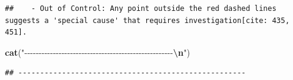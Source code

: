 \documentclass[
]{article}
\newenvironment{Shaded}{\begin{snugshade}}{\end{snugshade}}
\newcommand{\FunctionTok}[1]{\textcolor[rgb]{0.13,0.29,0.53}{\textbf{#1}}}
\newcommand{\NormalTok}[1]{#1}
\newcommand{\SpecialCharTok}[1]{\textcolor[rgb]{0.81,0.36,0.00}{\textbf{#1}}}
\newcommand{\StringTok}[1]{\textcolor[rgb]{0.31,0.60,0.02}{#1}}
\begin{document}
\begin{verbatim}
##    - Out of Control: Any point outside the red dashed lines suggests a 'special cause' that requires investigation[cite: 435, 451].
\end{verbatim}

\begin{Shaded}
\begin{Highlighting}[]
\FunctionTok{cat}\NormalTok{(}\StringTok{"{-}{-}{-}{-}{-}{-}{-}{-}{-}{-}{-}{-}{-}{-}{-}{-}{-}{-}{-}{-}{-}{-}{-}{-}{-}{-}{-}{-}{-}{-}{-}{-}{-}{-}{-}{-}{-}{-}{-}{-}{-}{-}{-}{-}{-}{-}{-}{-}{-}{-}{-}{-}}\SpecialCharTok{\textbackslash{}n}\StringTok{"}\NormalTok{)}
\end{Highlighting}
\end{Shaded}

\begin{verbatim}
## ----------------------------------------------------
\end{verbatim}
\end{document}
